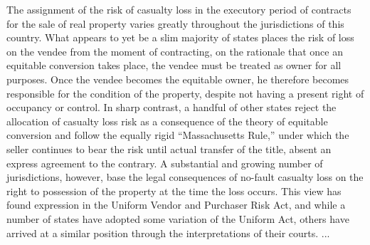 The assignment of the risk of casualty loss in the executory period of contracts
for the sale of real property varies greatly throughout the jurisdictions of
this country. What appears to yet be a slim majority of states places the risk
of loss on the vendee from the moment of contracting, on the rationale that
once an equitable conversion takes place, the vendee must be treated as owner
for all purposes. Once the vendee becomes the equitable owner, he therefore
becomes responsible for the condition of the property, despite not having a
present right of occupancy or control. In sharp contrast, a handful of other
states reject the allocation of casualty loss risk as a consequence of the
theory of equitable conversion and follow the equally rigid ``Massachusetts
Rule,'' under which the seller continues to bear the risk until actual transfer
of the title, absent an express agreement to the contrary. A substantial and
growing number of jurisdictions, however, base the legal consequences of
no-fault casualty loss on the right to possession of the property at the time
the loss occurs. This view has found expression in the Uniform Vendor and
Purchaser Risk Act, and while a number of states have adopted some variation of
the Uniform Act, others have arrived at a similar position through the
interpretations of their courts. ... 

